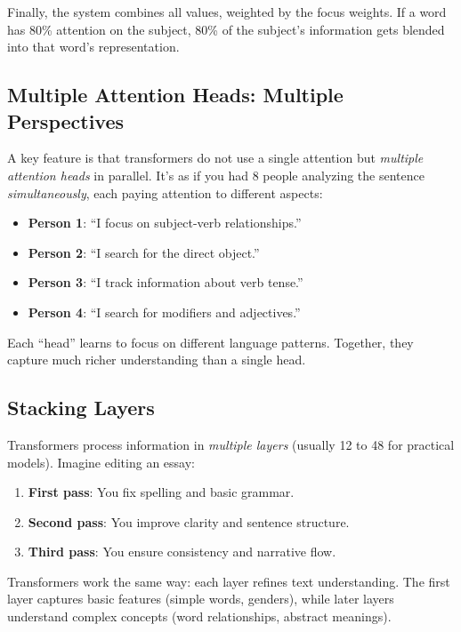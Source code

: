 Finally, the system combines all values, weighted by the focus weights. If a word has 80\% attention on the subject, 80\% of the subject's information gets blended into that word's representation.

\subsection{Multiple Attention Heads: Multiple Perspectives}

A key feature is that transformers do not use a single attention but \emph{multiple attention heads} in parallel. It's as if you had 8 people analyzing the sentence \emph{simultaneously}, each paying attention to different aspects:

\begin{itemize}[leftmargin=*]
    \item \textbf{Person 1}: ``I focus on subject-verb relationships.''
    \item \textbf{Person 2}: ``I search for the direct object.''
    \item \textbf{Person 3}: ``I track information about verb tense.''
    \item \textbf{Person 4}: ``I search for modifiers and adjectives.''
\end{itemize}

Each ``head'' learns to focus on different language patterns. Together, they capture much richer understanding than a single head.

\subsection{Stacking Layers}

Transformers process information in \emph{multiple layers} (usually 12 to 48 for practical models). Imagine editing an essay:
\begin{enumerate}[leftmargin=*]
    \item \textbf{First pass}: You fix spelling and basic grammar.
    \item \textbf{Second pass}: You improve clarity and sentence structure.
    \item \textbf{Third pass}: You ensure consistency and narrative flow.
\end{enumerate}

Transformers work the same way: each layer refines text understanding. The first layer captures basic features (simple words, genders), while later layers understand complex concepts (word relationships, abstract meanings).

